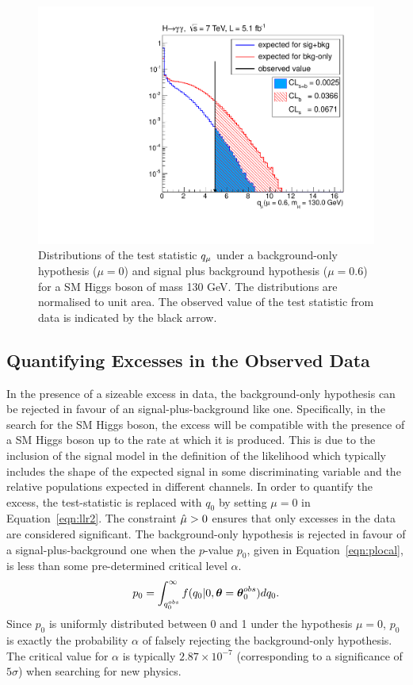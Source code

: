 \begin{figure}
\begin{center}
  \includegraphics[width=.8\textwidth]{hgg7TeV/statsPlots/qmu_example_130.pdf}
\end{center}
 \caption{Distributions of the test statistic $q_{\mu}$ under a background-only hypothesis
 ($\mu=0$) and signal plus background hypothesis ($\mu=0.6$) for a SM Higgs boson of mass 130 GeV. 
 The distributions are normalised to unit area. The observed value of the test statistic 
 from data is indicated by the black arrow.}
 \label{fig:qmuexample}
\end{figure}

\subsection{Quantifying Excesses in the Observed Data}

In the presence of a sizeable excess in data, the background-only hypothesis
can be rejected in favour of an signal-plus-background like one. Specifically, in 
the search for the SM Higgs boson, the excess 
will be compatible with the presence of a SM Higgs boson up to the rate
at which it is produced. This is due to the inclusion of the signal model 
in the definition of the likelihood which typically includes the shape of 
the expected signal in some discriminating variable and the relative populations
expected in different channels.
In order to quantify the excess, the test-statistic
is replaced with $q_{0}$ by setting $\mu=0$ in Equation~\ref{eqn:llr2}.
The constraint $\hat{\mu}>0$ ensures that only excesses in the data are considered significant.
The background-only hypothesis is rejected in favour of a signal-plus-background one
when the $p$-value $p_{0}$, given in Equation~\ref{eqn:plocal},
is less than some pre-determined critical level $\alpha$.
\begin{equation}
  p_{0} = \int_{q_{0}^{obs}}^{\infty} f(q_{0} |0,{\boldsymbol{\theta}}={\boldsymbol{\theta}}_{0}^{obs}) dq_{0}.
\label{eqn:plocal}
\end{equation}
Since $p_{0}$ is uniformly distributed between 0 and 1 under the hypothesis $\mu=0$,
$p_{0}$ is exactly the probability $\alpha$ of falsely rejecting the background-only hypothesis. 
The critical value for $\alpha$ is typically $2.87\times10^{-7}$ (corresponding 
to a significance of $5\sigma$) when searching for new physics.  

